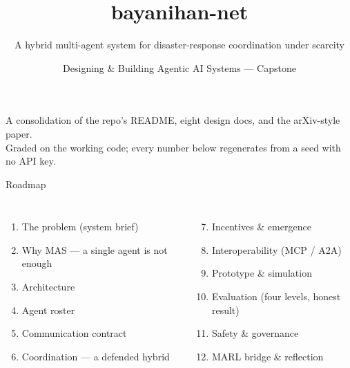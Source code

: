 \documentclass[aspectratio=169,11pt]{beamer}
\title[bayanihan-net]{\textbf{bayanihan-net}}
\subtitle{A hybrid multi-agent system for disaster-response coordination under scarcity}
\author[Capstone]{Designing \& Building Agentic AI Systems --- Capstone}
\institute[McGill MMA]{Marikina flood basin, Metro Manila \quad$\cdot$\quad reproducible from seed \texttt{20260620}}
\date{}
\begin{document}
\begin{frame}[plain]
  \titlepage
  \begin{center}\footnotesize
  A consolidation of the repo's README, eight design docs, and the arXiv-style paper.\\
  Graded on the working code; every number below regenerates from a seed with no API key.
  \end{center}
\end{frame}

\begin{frame}{Roadmap}
  \small
  \begin{columns}[T]
    \begin{enumerate}
      \item The problem (system brief)
      \item Why MAS --- a single agent is not enough
      \item Architecture
      \item Agent roster
      \item Communication contract
      \item Coordination --- a defended hybrid
    \end{enumerate}
    \begin{enumerate}\setcounter{enumi}{6}
      \item Incentives \& emergence
      \item Interoperability (MCP / A2A)
      \item Prototype \& simulation
      \item Evaluation (four levels, honest result)
      \item Safety \& governance
      \item MARL bridge \& reflection
    \end{enumerate}
  \end{columns}
\end{frame}
\end{document}
